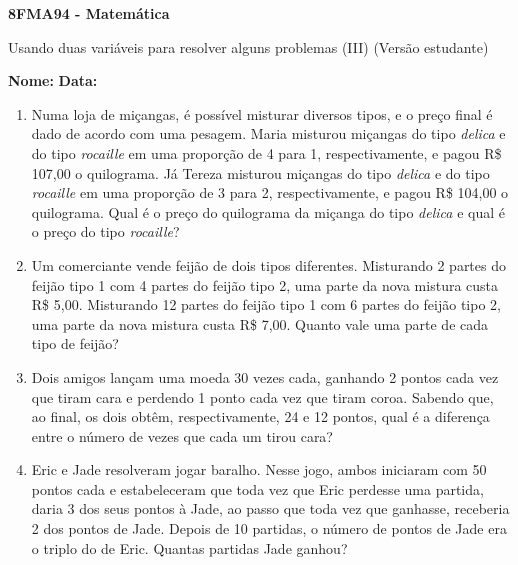 \documentclass[a4paper,14pt]{article}
\begin{document}
	
	\noindent\textbf{8FMA94 - Matemática} 
	
	\begin{center}Usando duas variáveis para resolver alguns problemas (III) (Versão estudante)
	\end{center}
	
	\noindent\textbf{Nome:} \underline{\hspace{10cm}}
	\noindent\textbf{Data:} \underline{\hspace{4cm}}
	
    \begin{multicols}{2}
    	\begin{enumerate}
			\item Numa loja de miçangas, é possível misturar diversos tipos, e o preço final é dado de acordo com uma pesagem. Maria misturou miçangas do tipo \textit{delica} e do tipo \textit{rocaille} em uma proporção de 4 para 1, respectivamente, e pagou R\$ 107,00 o quilograma. Já Tereza misturou miçangas do tipo \textit{delica} e do tipo \textit{rocaille} em uma proporção de 3 para 2, respectivamente, e pagou R\$ 104,00 o quilograma. Qual é o preço do quilograma da miçanga do tipo \textit{delica} e qual é o preço do tipo \textit{rocaille}? \columnbreak
			\item Um comerciante vende feijão de dois tipos diferentes. Misturando 2 partes do feijão tipo 1 com 4 partes do feijão tipo 2, uma parte da nova mistura custa R\$ 5,00. Misturando 12 partes do feijão tipo 1 com 6 partes do feijão tipo 2, uma parte da nova mistura custa R\$ 7,00. Quanto vale uma parte de cada tipo de feijão? \newpage
			\item Dois amigos lançam uma moeda 30 vezes cada, ganhando 2 pontos cada vez que tiram cara e perdendo 1 ponto cada vez que tiram coroa. Sabendo que, ao final, os dois obtêm, respectivamente, 24 e 12 pontos, qual é a diferença entre o número de vezes que cada um tirou cara?  \columnbreak
			\item Eric e Jade resolveram jogar baralho. Nesse jogo, ambos iniciaram com 50 pontos cada e estabeleceram que toda vez que Eric perdesse uma partida, daria 3 dos seus pontos à Jade, ao passo que toda vez que ganhasse, receberia 2 dos pontos de Jade. Depois de 10 partidas, o número de pontos de Jade era o triplo do de Eric. Quantas partidas Jade ganhou?  \\\\\\\\\\\\\\\\\\\\
			

\end{enumerate}
\end{multicols}
\end{document}
